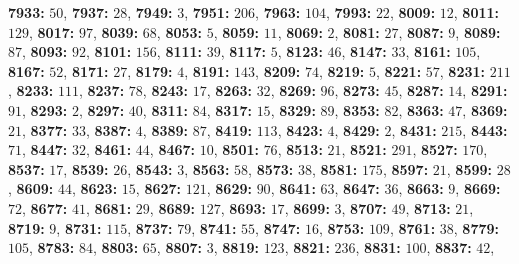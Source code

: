 \textsf{\bfseries 7933:} $50$, \textsf{\bfseries 7937:} $28$, \textsf{\bfseries 7949:} $3$, \textsf{\bfseries 7951:} $206$, \textsf{\bfseries 7963:} $104$, \textsf{\bfseries 7993:} $22$, \textsf{\bfseries 8009:} $12$, \textsf{\bfseries 8011:} $129$, \textsf{\bfseries 8017:} $97$, \textsf{\bfseries 8039:} $68$, \textsf{\bfseries 8053:} $5$, \textsf{\bfseries 8059:} $11$, \textsf{\bfseries 8069:} $2$, \textsf{\bfseries 8081:} $27$, \textsf{\bfseries 8087:} $9$, \textsf{\bfseries 8089:} $87$, \textsf{\bfseries 8093:} $92$, \textsf{\bfseries 8101:} $156$, \textsf{\bfseries 8111:} $39$, \textsf{\bfseries 8117:} $5$, \textsf{\bfseries 8123:} $46$, \textsf{\bfseries 8147:} $33$, \textsf{\bfseries 8161:} $105$, \textsf{\bfseries 8167:} $52$, \textsf{\bfseries 8171:} $27$, \textsf{\bfseries 8179:} $4$, \textsf{\bfseries 8191:} $143$, \textsf{\bfseries 8209:} $74$, \textsf{\bfseries 8219:} $5$, \textsf{\bfseries 8221:} $57$, \textsf{\bfseries 8231:} $211$, \textsf{\bfseries 8233:} $111$, \textsf{\bfseries 8237:} $78$, \textsf{\bfseries 8243:} $17$, \textsf{\bfseries 8263:} $32$, \textsf{\bfseries 8269:} $96$, \textsf{\bfseries 8273:} $45$, \textsf{\bfseries 8287:} $14$, \textsf{\bfseries 8291:} $91$, \textsf{\bfseries 8293:} $2$, \textsf{\bfseries 8297:} $40$, \textsf{\bfseries 8311:} $84$, \textsf{\bfseries 8317:} $15$, \textsf{\bfseries 8329:} $89$, \textsf{\bfseries 8353:} $82$, \textsf{\bfseries 8363:} $47$, \textsf{\bfseries 8369:} $21$, \textsf{\bfseries 8377:} $33$, \textsf{\bfseries 8387:} $4$, \textsf{\bfseries 8389:} $87$, \textsf{\bfseries 8419:} $113$, \textsf{\bfseries 8423:} $4$, \textsf{\bfseries 8429:} $2$, \textsf{\bfseries 8431:} $215$, \textsf{\bfseries 8443:} $71$, \textsf{\bfseries 8447:} $32$, \textsf{\bfseries 8461:} $44$, \textsf{\bfseries 8467:} $10$, \textsf{\bfseries 8501:} $76$, \textsf{\bfseries 8513:} $21$, \textsf{\bfseries 8521:} $291$, \textsf{\bfseries 8527:} $170$, \textsf{\bfseries 8537:} $17$, \textsf{\bfseries 8539:} $26$, \textsf{\bfseries 8543:} $3$, \textsf{\bfseries 8563:} $58$, \textsf{\bfseries 8573:} $38$, \textsf{\bfseries 8581:} $175$, \textsf{\bfseries 8597:} $21$, \textsf{\bfseries 8599:} $28$, \textsf{\bfseries 8609:} $44$, \textsf{\bfseries 8623:} $15$, \textsf{\bfseries 8627:} $121$, \textsf{\bfseries 8629:} $90$, \textsf{\bfseries 8641:} $63$, \textsf{\bfseries 8647:} $36$, \textsf{\bfseries 8663:} $9$, \textsf{\bfseries 8669:} $72$, \textsf{\bfseries 8677:} $41$, \textsf{\bfseries 8681:} $29$, \textsf{\bfseries 8689:} $127$, \textsf{\bfseries 8693:} $17$, \textsf{\bfseries 8699:} $3$, \textsf{\bfseries 8707:} $49$, \textsf{\bfseries 8713:} $21$, \textsf{\bfseries 8719:} $9$, \textsf{\bfseries 8731:} $115$, \textsf{\bfseries 8737:} $79$, \textsf{\bfseries 8741:} $55$, \textsf{\bfseries 8747:} $16$, \textsf{\bfseries 8753:} $109$, \textsf{\bfseries 8761:} $38$, \textsf{\bfseries 8779:} $105$, \textsf{\bfseries 8783:} $84$, \textsf{\bfseries 8803:} $65$, \textsf{\bfseries 8807:} $3$, \textsf{\bfseries 8819:} $123$, \textsf{\bfseries 8821:} $236$, \textsf{\bfseries 8831:} $100$, \textsf{\bfseries 8837:} $42$, 
